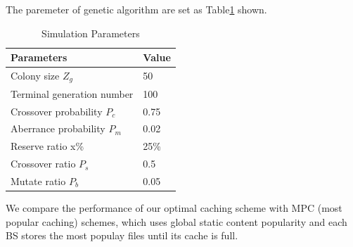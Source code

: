\documentclass[conference]{IEEEtran}
\begin{document}
The paremeter of genetic algorithm are set as Table\ref{tab1} shown.
\begin{table}[htbp]
 \caption{Simulation Parameters}
 \begin{center}
  \begin{tabular}{|l|l|}
   \hline
   Parameters                     & Value              \\\hline
   Colony size $Z_g$              & 50                 \\ \hline
   Terminal generation number     & 100                \\\hline
   Crossover probability $P_c$    & 0.75               \\ \hline
   Aberrance probability $P_m$    & 0.02               \\\hline
   Reserve ratio x\%              & 25\%               \\\hline
   Crossover ratio $P_s$          & 0.5                \\\hline
   Mutate ratio $P_b$             & 0.05               \\\hline
  \end{tabular}
  \label{tab1}
 \end{center}
\end{table}

We compare the performance of our optimal caching scheme with MPC (most popular caching) schemes, which uses global static content popularity and each BS stores the most populay files until its cache is full.
\end{document}
